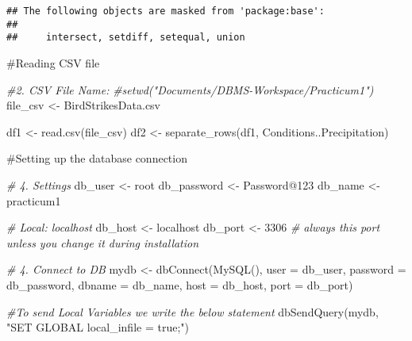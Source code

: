\documentclass[
]{article}
\newenvironment{Shaded}{\begin{snugshade}}{\end{snugshade}}
\newcommand{\AttributeTok}[1]{\textcolor[rgb]{0.77,0.63,0.00}{#1}}
\newcommand{\CommentTok}[1]{\textcolor[rgb]{0.56,0.35,0.01}{\textit{#1}}}
\newcommand{\DecValTok}[1]{\textcolor[rgb]{0.00,0.00,0.81}{#1}}
\newcommand{\FunctionTok}[1]{\textcolor[rgb]{0.00,0.00,0.00}{#1}}
\newcommand{\NormalTok}[1]{#1}
\newcommand{\OtherTok}[1]{\textcolor[rgb]{0.56,0.35,0.01}{#1}}
\newcommand{\StringTok}[1]{\textcolor[rgb]{0.31,0.60,0.02}{#1}}
\begin{document}
\begin{verbatim}
## The following objects are masked from 'package:base':
## 
##     intersect, setdiff, setequal, union
\end{verbatim}

\#Reading CSV file

\begin{Shaded}
\begin{Highlighting}[]
\CommentTok{\#2. CSV File Name:}
\CommentTok{\#setwd("Documents/DBMS{-}Workspace/Practicum1")}
\NormalTok{file\_csv }\OtherTok{\textless{}{-}} \StringTok{\textquotesingle{}BirdStrikesData.csv\textquotesingle{}}

\NormalTok{df1 }\OtherTok{\textless{}{-}} \FunctionTok{read.csv}\NormalTok{(file\_csv)}
\NormalTok{df2 }\OtherTok{\textless{}{-}} \FunctionTok{separate\_rows}\NormalTok{(df1, Conditions..Precipitation)}
\end{Highlighting}
\end{Shaded}

\#Setting up the database connection

\begin{Shaded}
\begin{Highlighting}[]
\CommentTok{\# 4. Settings}
\NormalTok{db\_user }\OtherTok{\textless{}{-}} \StringTok{\textquotesingle{}root\textquotesingle{}}
\NormalTok{db\_password }\OtherTok{\textless{}{-}} \StringTok{\textquotesingle{}Password@123\textquotesingle{}}
\NormalTok{db\_name }\OtherTok{\textless{}{-}} \StringTok{\textquotesingle{}practicum1\textquotesingle{}}

\CommentTok{\# Local: localhost}
\NormalTok{db\_host }\OtherTok{\textless{}{-}} \StringTok{\textquotesingle{}localhost\textquotesingle{}} 
\NormalTok{db\_port }\OtherTok{\textless{}{-}} \DecValTok{3306} \CommentTok{\# always this port unless you change it during installation}

\CommentTok{\# 4. Connect to DB}
\NormalTok{mydb }\OtherTok{\textless{}{-}}  \FunctionTok{dbConnect}\NormalTok{(}\FunctionTok{MySQL}\NormalTok{(), }\AttributeTok{user =}\NormalTok{ db\_user, }\AttributeTok{password =}\NormalTok{ db\_password,}
                \AttributeTok{dbname =}\NormalTok{ db\_name, }\AttributeTok{host =}\NormalTok{ db\_host, }\AttributeTok{port =}\NormalTok{ db\_port)}

\CommentTok{\#To send Local Variables we write the below statement}
\FunctionTok{dbSendQuery}\NormalTok{(mydb, }\StringTok{"SET GLOBAL local\_infile = true;"}\NormalTok{)}
\end{Highlighting}
\end{Shaded}
\end{document}
